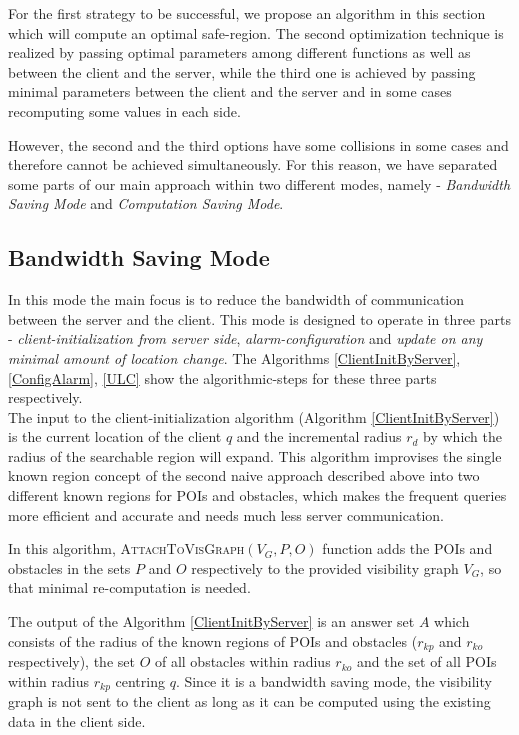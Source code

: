 \documentclass{sig-alternate}
\begin{document}
For the first strategy to be successful, we propose an algorithm in this section which will compute an optimal safe-region. The second optimization technique is realized by passing optimal parameters among different functions as well as between the client and the server, while the third one is achieved by passing minimal parameters between the client and the server and in some cases recomputing some values in each side.

However, the second and the third options have some collisions in some cases and therefore cannot be achieved simultaneously. For this reason, we have separated some parts of our main approach within two different modes, namely - \textit{Bandwidth Saving Mode} and \textit{Computation Saving Mode}.

\subsection{Bandwidth Saving Mode}
In this mode the main focus is to reduce the bandwidth of communication between the server and the client. This mode is designed to operate in three parts - \textit{client-initialization from server side}, \textit{alarm-configuration} and \textit{update on any minimal amount of location change}. The Algorithms \ref{ClientInitByServer}, \ref{ConfigAlarm}, \ref{ULC} show the algorithmic-steps for these three parts respectively.\\

The input to the client-initialization algorithm (Algorithm \ref{ClientInitByServer}) is the current location of the client $q$ and the incremental radius $r_d$ by which the radius of the searchable region will expand. This algorithm improvises the single known region concept of the second naive approach described above into two different known regions for POIs and obstacles, which makes the frequent queries more efficient and accurate and needs much less server communication. 

In this algorithm, \textsc{AttachToVisGraph}$(V_G, P, O)$ function adds the POIs and obstacles in the sets $P$ and $O$ respectively to the provided visibility graph $V_G$, so that minimal re-computation is needed.

The output of the Algorithm \ref{ClientInitByServer} is an answer set $A$ which consists of the radius of the known regions of POIs and obstacles ($r_{kp}$ and $r_{ko}$ respectively), the set $O$ of all obstacles within radius $r_{ko}$ and the set of all POIs within radius $r_{kp}$ centring $q$. Since it is a bandwidth saving mode, the visibility graph is not sent to the client as long as it can be computed using the existing data in the client side.\\
\end{document}
